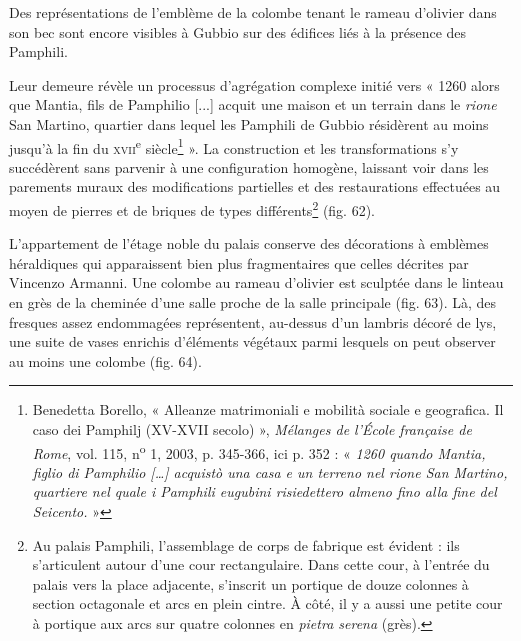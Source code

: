 \documentclass[12pt,twoside,openany]{book}
\begin{document}
Des représentations de l’emblème de la colombe tenant le rameau d’olivier dans son bec sont encore visibles à Gubbio sur des édifices liés à la présence des Pamphili.

Leur demeure révèle un processus d’agrégation complexe initié vers « 1260 alors que Mantia, fils de Pamphilio [...] acquit une maison et un terrain dans le \textit{rione} San Martino, quartier dans lequel les Pamphili de Gubbio résidèrent au moins jusqu’à la fin du \textsc{xvii}\textsuperscript{e} siècle\footnote{Benedetta Borello, « Alleanze matrimoniali e mobilità sociale e geografica. Il caso dei Pamphilj (XV-XVII secolo) », \textit{Mélanges de l'École française de Rome}, vol. 115, n\textsuperscript{o} 1, 2003, p. 345-366, ici p. 352 : « \textit{1260 quando Mantia, figlio di Pamphilio […] acquistò una casa e un terreno nel rione San Martino, quartiere nel quale i Pamphili eugubini risiedettero almeno fino alla fine del Seicento.} »} ». La construction et les transformations s’y succédèrent sans parvenir à une configuration homogène, laissant voir dans les parements muraux des modifications partielles et des restaurations effectuées au moyen de pierres et de briques de types différents\footnote{Au palais Pamphili, l’assemblage de corps de fabrique est évident : ils s’articulent autour d’une cour rectangulaire. Dans cette cour, à l'entrée du palais vers la place adjacente, s’inscrit un portique de douze colonnes à section octagonale et arcs en plein cintre. À côté, il y a aussi une petite cour à portique aux arcs sur quatre colonnes en \textit{pietra serena }(grès).} (fig. 62).

L’appartement de l’étage noble du palais conserve des décorations à emblèmes héraldiques qui apparaissent bien plus fragmentaires que celles décrites par Vincenzo Armanni. Une colombe au rameau d’olivier est sculptée dans le linteau en grès de la cheminée d’une salle proche de la salle principale (fig. 63). Là, des fresques assez endommagées représentent, au-dessus d’un lambris décoré de lys, une suite de vases enrichis d’éléments végétaux parmi lesquels on peut observer au moins une colombe (fig. 64).
\end{document}
